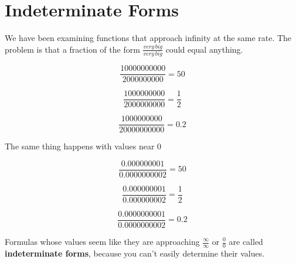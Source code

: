 \documentclass{ximera}
\begin{document}
\begin{example}
\begin{image}
\end{image}






\end{example}








\section{Indeterminate Forms}


We have been examining functions that approach infinity at the same rate.  The problem is that a fraction of the form $\frac{very \, big}{very \, big}$ could equal anything.



\[  \frac{10000000000}{2000000000} = 50      \]

\[  \frac{1000000000}{2000000000} = \frac{1}{2}      \]

\[  \frac{1000000000}{20000000000} = 0.2      \]





The same thing happens with values near $0$


\[  \frac{0.000000001}{0.0000000002} = 50      \]

\[  \frac{0.000000001}{0.000000002} = \frac{1}{2}      \]

\[  \frac{0.0000000001}{0.0000000002} = 0.2      \]





Formulas whose values seem like they are approaching $\frac{\infty}{\infty}$ or $\frac{0}{0}$ are called \textbf{indeterminate forms}, because you can't easily determine their values.
\end{document}
